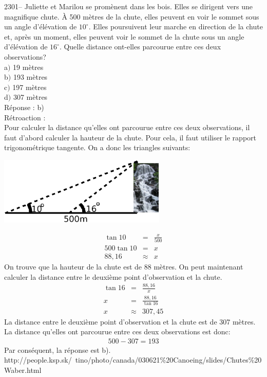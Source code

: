 \documentclass[letterpaper, 12pt]{article}
\begin{document}
2301-- Juliette et Marilou se prom\`enent dans les bois. Elles se dirigent vers une magnifique chute. \`A 500 m\`etres de la chute, elles peuvent en voir le sommet sous un angle d'\'el\'evation de $10^{\circ}$. Elles poursuivent leur marche en direction de la chute et, apr\`es un moment, elles peuvent voir le sommet de la chute sous un angle d'\'el\'evation de $16^{\circ}$. Quelle distance ont-elles parcourue entre ces deux observations? \\

a$)$ 19 m\`etres\\
b$)$ 193 m\`etres\\
c$)$ 197 m\`etres\\
d$)$ 307 m\`etres\\

R\'eponse : b)\\

R\'etroaction :\\
Pour calculer la distance qu'elles ont parcourue entre ces deux observations, il faut d'abord calculer la hauteur de la chute. Pour cela, il faut utiliser le rapport trigonom\'etrique tangente. On a donc les triangles suivants:
\begin{center}
 \includegraphics[width=8cm,bb=14 14 845 315]{Q2301chutes.eps}
\end{center}
\begin{eqnarray*}
\tan{10}&=&\frac{x}{500}\\[2mm]
500\tan{10}&=&x\\[2mm]
88,16&\approx&x
\end{eqnarray*}
On trouve que la hauteur de la chute est de 88 m\`etres. On peut maintenant calculer la distance entre le deuxi\`eme point d'observation et la chute.
\begin{eqnarray*}
\tan{16}&=&\frac{88,16}{x}\\[2mm]
x&=&\frac{88,16}{\tan{16}}\\[2mm]
x&\approx&307,45
\end{eqnarray*}
La distance entre le deuxi\`eme point d'observation et la chute est de 307 m\`etres. La distance qu'elles ont parcourue entre ces deux observations est donc:
\begin{eqnarray*}
500-307=193
\end{eqnarray*}
Par cons\'equent, la r\'eponse est b).\\
http://people.ksp.sk/~tino/photo/canada/030621\%20Canoeing/slides/Chutes\%20Waber.html\\
\end{document}

